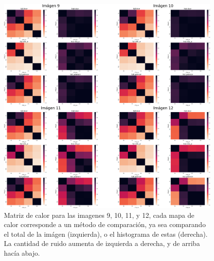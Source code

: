 \begin{figure}
    \centering
    \includegraphics[width=\textwidth]{figuras/heatmaps/heatmaps_app_2.png}
    \caption{Matriz de calor para las imagenes 9, 10, 11, y 12, cada mapa de calor corresponde a un m\'etodo de comparaci\'on, ya sea comparando el total de la im\'agen (izquierda), o el histograma de estas (derecha). La cantidad de ruido aumenta de izquierda a derecha, y de arriba hacía abajo.}
\end{figure}


